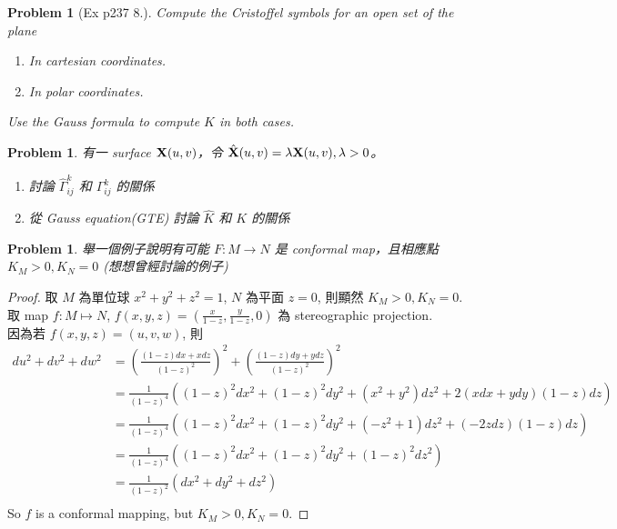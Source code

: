 \documentclass[10pt,a4paper]{article}
\newcounter{theProblemCounter}
\newtheorem{problem}[theProblemCounter]{Problem}
\begin{document}
\setcounter{theProblemCounter}{3}
\begin{problem}[Ex p237 8.]
Compute the Cristoffel symbols for an open set of the plane
\begin{enumerate}
\item[(a)] In cartesian coordinates.
\item[(b)] In polar coordinates.
\end{enumerate}
Use the Gauss formula to compute $K$ in both cases.
\end{problem}

\setcounter{theProblemCounter}{5}
\begin{problem}
有一 surface $\mathbf{X}(u, v)$，令 $\hat{\mathbf{X}}(u, v)=\lambda \mathbf{X}(u,v), \lambda > 0$。
\begin{enumerate}
\item[(a)] 討論 $\hat{\Gamma}^k_{ij}$ 和 $\Gamma^k_{ij}$ 的關係
\item[(b)] 從 Gauss equation(GTE) 討論 $\hat{K}$ 和 $K$ 的關係
\end{enumerate}
\end{problem}

\setcounter{theProblemCounter}{8}
\begin{problem}
舉一個例子說明有可能 $F:M\to N$ 是 conformal map，且相應點 $K_M>0, K_N=0$ (想想曾經討論的例子)
\end{problem}
\begin{proof}
取 $M$ 為單位球 $x^2+y^2+z^2=1$, $N$ 為平面 $z=0$, 則顯然 $K_M>0, K_N=0$.\\
取 map $f: M\mapsto N$, $f(x,y,z)=(\frac{x}{1-z},\frac{y}{1-z},0)$ 為 stereographic projection.\\
因為若 $f(x,y,z)=(u,v,w)$, 則
\begin{align*}
du^2+dv^2+dw^2&=\left(\frac{(1-z)dx+x dz}{(1-z)^2}\right)^2+\left(\frac{(1-z)dy+y dz}{(1-z)^2}\right)^2\\
&=\frac{1}{(1-z)^4}\left((1-z)^2dx^2+(1-z)^2dy^2+(x^2+y^2)dz^2+2(xdx+ydy)(1-z)dz\right)\\
&=\frac{1}{(1-z)^4}\left((1-z)^2dx^2+(1-z)^2dy^2+(-z^2+1)dz^2+(-2zdz)(1-z)dz\right)\\
&=\frac{1}{(1-z)^4}\left((1-z)^2dx^2+(1-z)^2dy^2+(1-z)^2dz^2\right)\\
&=\frac{1}{(1-z)^2}\left(dx^2+dy^2+dz^2\right)\\
\end{align*}
So $f$ is a conformal mapping, but $K_M>0, K_N=0$.
\end{proof}
\end{document}

